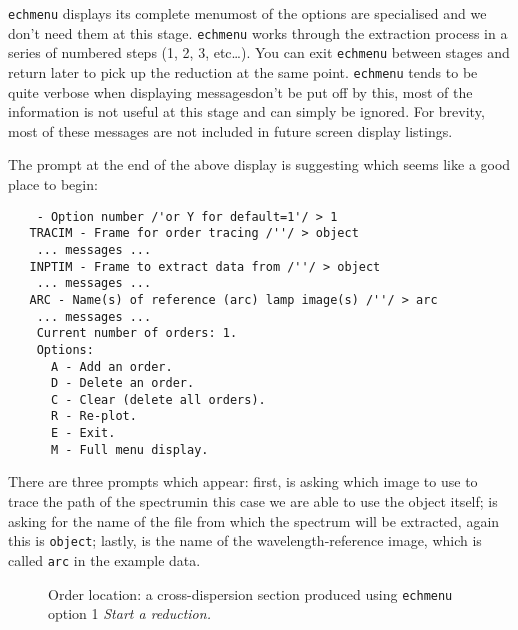 \verb+echmenu+ displays its complete menu\scspec{---}{ - }most of the options
are specialised and we don't need them at this stage.
\verb+echmenu+ works through the extraction process in a series of numbered
steps (1, 2, 3, etc\ldots).  You can exit \verb+echmenu+ between stages
and return later to pick up the reduction at the same point.
\verb+echmenu+ tends to be quite verbose when displaying
messages\scspec{---}{ - }don't be put off by this, most of the information
is not useful at this stage and can simply be ignored.
For brevity, most of these messages are not included in future screen
display listings.

The prompt at the end of the above display is suggesting
which seems like a good place to begin:

{
\scspec{\small}{ }
\begin{verbatim}
    - Option number /'or Y for default=1'/ > 1
   TRACIM - Frame for order tracing /''/ > object
    ... messages ...
   INPTIM - Frame to extract data from /''/ > object
    ... messages ...
   ARC - Name(s) of reference (arc) lamp image(s) /''/ > arc
    ... messages ...
    Current number of orders: 1.
    Options:
      A - Add an order.
      D - Delete an order.
      C - Clear (delete all orders).
      R - Re-plot.
      E - Exit.
      M - Full menu display.
\end{verbatim}
}

There are three prompts which appear: first,
 is asking which
image to use to trace the path of the spectrum\scspec{---}{ - }in this case
we are able to use the object itself;
 is asking for the name of
the file from which the spectrum will be extracted, again this is
\verb+object+; lastly,
 is the name of the wavelength-reference
image, which is called \verb+arc+ in the example data.

\begin{figure}
\begin{center}
{\leavevmode\epsfysize=136mm}

\parbox{140mm}{
\caption{Order location: a cross-dispersion section produced using
{\tt echmenu} option 1 {\sl Start a reduction.}}
\label{fi_order_locate}
}
\end{center}
\end{figure}

